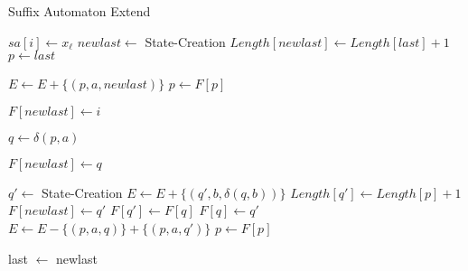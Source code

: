 \begin{alg}
	Suffix Automaton Extend
	\begin{algorithmic}[1]
		
			\State $sa[i] \leftarrow x_\ell$
			\State $newlast \leftarrow$ State-Creation
			\State $Length[newlast] \leftarrow Length[last]+1$
			\State $p \leftarrow last$

				\State  $E \leftarrow E + \{(p, a, newlast)\}$
				\State  $p \leftarrow F[p]$
			\EndWhile

				\State $F[newlast] \leftarrow i$
			
			\Else
				\State $q \leftarrow \delta(p, a)$
				
					\State $F[newlast] \leftarrow q$
				
				\Else
					\State $q' \leftarrow$ State-Creation
						\State  $E \leftarrow E + \{(q', b, \delta(q, b))\}$
					\EndFor
					\State $Length[q'] \leftarrow Length[p]+1$
					\State $F[newlast] \leftarrow q'$
					\State $F[q'] \leftarrow F[q]$
					\State $F[q] \leftarrow q'$
						\State  $E \leftarrow E - \{(p, a, q)\} + \{(p, a, q')\}$
						\State  $p \leftarrow F[p]$
					\EndWhile
				\EndIf

			\EndIf
			
			\State last $\leftarrow$ newlast
				
		\EndFunction
				
	\end{algorithmic}
\end{alg}

\cite{book:Crochemore1997}